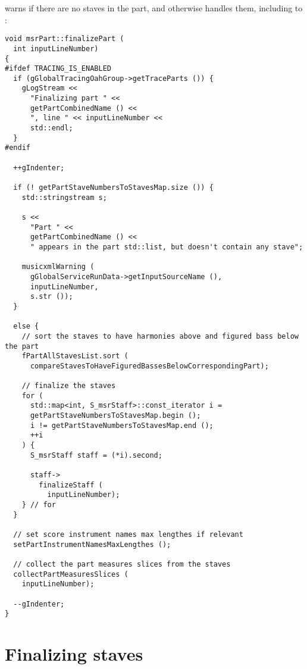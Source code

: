  warns if there are no staves in the part, and otherwise handles them, including \cascading to :
\begin{lstlisting}[language=CPlusPlus]
void msrPart::finalizePart (
  int inputLineNumber)
{
#ifdef TRACING_IS_ENABLED
  if (gGlobalTracingOahGroup->getTraceParts ()) {
    gLogStream <<
      "Finalizing part " <<
      getPartCombinedName () <<
      ", line " << inputLineNumber <<
      std::endl;
  }
#endif

  ++gIndenter;

  if (! getPartStaveNumbersToStavesMap.size ()) {
    std::stringstream s;

    s <<
      "Part " <<
      getPartCombinedName () <<
      " appears in the part std::list, but doesn't contain any stave";

    musicxmlWarning (
      gGlobalServiceRunData->getInputSourceName (),
      inputLineNumber,
      s.str ());
  }

  else {
    // sort the staves to have harmonies above and figured bass below the part
    fPartAllStavesList.sort (
      compareStavesToHaveFiguredBassesBelowCorrespondingPart);

    // finalize the staves
    for (
      std::map<int, S_msrStaff>::const_iterator i =
      getPartStaveNumbersToStavesMap.begin ();
      i != getPartStaveNumbersToStavesMap.end ();
      ++i
    ) {
      S_msrStaff staff = (*i).second;

      staff->
        finalizeStaff (
          inputLineNumber);
    } // for
  }

  // set score instrument names max lengthes if relevant
  setPartInstrumentNamesMaxLengthes ();

  // collect the part measures slices from the staves
  collectPartMeasuresSlices (
    inputLineNumber);

  --gIndenter;
}
\end{lstlisting}



\section{Finalizing staves}

